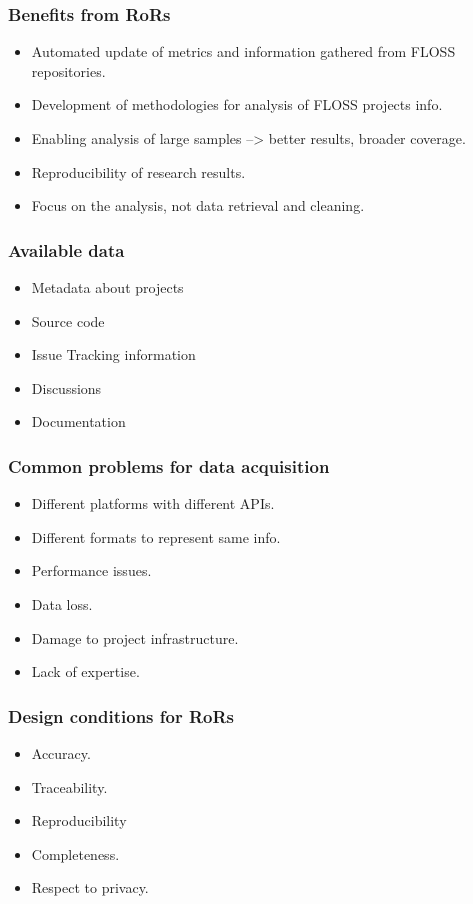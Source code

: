 \documentclass{beamer}
\begin{document}
\begin{frame}
\frametitle{Benefits from RoRs}
\begin{itemize}
\item Automated update of metrics and information gathered from FLOSS repositories.
\item Development of methodologies for analysis of FLOSS projects info.
\item Enabling analysis of large samples --> better results, broader coverage.
\item Reproducibility of research results.
\item Focus on the analysis, not data retrieval and cleaning.
\end{itemize}
\end{frame}

\begin{frame}
\frametitle{Available data}
\begin{itemize}
\item Metadata about projects
\item Source code
\item Issue Tracking information
\item Discussions
\item Documentation
\end{itemize}
\end{frame}

\begin{frame}
\frametitle{Common problems for data acquisition}
\begin{itemize}
\item Different platforms with different APIs.
\item Different formats to represent same info.
\item Performance issues.
\item Data loss.
\item Damage to project infrastructure.
\item Lack of expertise.
\end{itemize}
\end{frame}

\begin{frame}
\frametitle{Design conditions for RoRs}
\begin{itemize}
\item Accuracy.
\item Traceability.
\item Reproducibility
\item Completeness.
\item Respect to privacy.
\end{itemize}
\end{frame}
\end{document}
